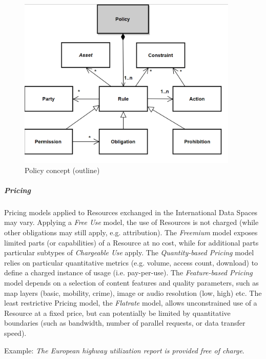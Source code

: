 
\begin{figure}[H]
	\begin{Center}
		\includegraphics[width=4.14in,height=3.22in]{./media/image46.png}
		\caption{Policy concept (outline)}
		\label{fig:Policy_concept_outline}
	\end{Center}
\end{figure}





\subparagraph*{Pricing}
Pricing models applied to Resources exchanged in the International Data Spaces may vary. Applying a \textit{Free Use }model, the use of Resources is not charged (while other obligations may still apply, e.g. attribution). The \textit{Freemium} model exposes limited parts (or capabilities) of a Resource at no cost, while for additional parts particular subtypes of \textit{Chargeable Use} apply. The \textit{Quantity-based Pricing} model relies on particular quantitative metrics (e.g. volume, access count, download) to define a charged instance of usage (i.e. pay-per-use). The \textit{Feature-based Pricing} model depends on a selection of content features and quality parameters, such as map layers (basic, mobility, crime), image or audio resolution (low, high) etc. The least restrictive Pricing model, the \textit{Flatrate} model, allows unconstrained use of a Resource at a fixed price, but can potentially be limited by quantitative boundaries (such as bandwidth, number of parallel requests, or data transfer speed).

 Example: \textit{The European highway utilization report is provided free of charge}.


